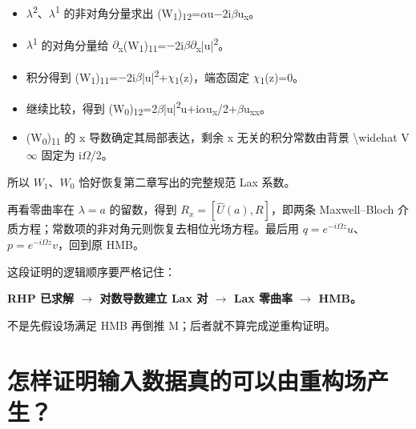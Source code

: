 \begin{itemize}[leftmargin=2em]
\item \ensuremath{\lambda}\textsuperscript{2}、\ensuremath{\lambda}\textsuperscript{1} 的非对角分量求出 (W\textsubscript{1})\textsubscript{1}\textsubscript{2}=\ensuremath{\alpha}u\ensuremath{-}2i\ensuremath{\beta}u\textsubscript{x}。
\item \ensuremath{\lambda}\textsuperscript{1} 的对角分量给 \ensuremath{\partial}\textsubscript{x}(W\textsubscript{1})\textsubscript{1}\textsubscript{1}=\ensuremath{-}2i\ensuremath{\beta}\ensuremath{\partial}\textsubscript{x}|u|\textsuperscript{2}。
\item 积分得到 (W\textsubscript{1})\textsubscript{1}\textsubscript{1}=\ensuremath{-}2i\ensuremath{\beta}|u|\textsuperscript{2}+\ensuremath{\chi}\textsubscript{1}(z)，端态固定 \ensuremath{\chi}\textsubscript{1}(z)=0。
\item 继续比较，得到 (W\textsubscript{0})\textsubscript{1}\textsubscript{2}=2\ensuremath{\beta}|u|\textsuperscript{2}u+i\ensuremath{\alpha}u\textsubscript{x}/2+\ensuremath{\beta}u\textsubscript{x}\textsubscript{x}。
\item (W\textsubscript{0})\textsubscript{1}\textsubscript{1} 的 x 导数确定其局部表达，剩余 x 无关的积分常数由背景 \textbackslash{}widehat V\ensuremath{\infty} 固定为 i\ensuremath{\Omega}/2。
\end{itemize}

所以 $W_{1}$、$W_{0}$ 恰好恢复第二章写出的完整规范 Lax 系数。\par

再看零曲率在 $\lambda{}=a$ 的留数，得到 $R_{x}=[\widehat U(a),R]$，即两条 Maxwell–Bloch 介质方程；常数项的非对角元则恢复去相位光场方程。最后用 $q=e^{-i\Omega{}z}u$、$p=e^{-i\Omega{}z}v$，回到原 HMB。\par

这段证明的逻辑顺序要严格记住：\par

\textbf{RHP 已求解 \ensuremath{\to} 对数导数建立 Lax 对 \ensuremath{\to} Lax 零曲率 \ensuremath{\to} HMB。}\par

不是先假设场满足 HMB 再倒推 M；后者就不算完成逆重构证明。\par

\section{怎样证明输入数据真的可以由重构场产生？}

